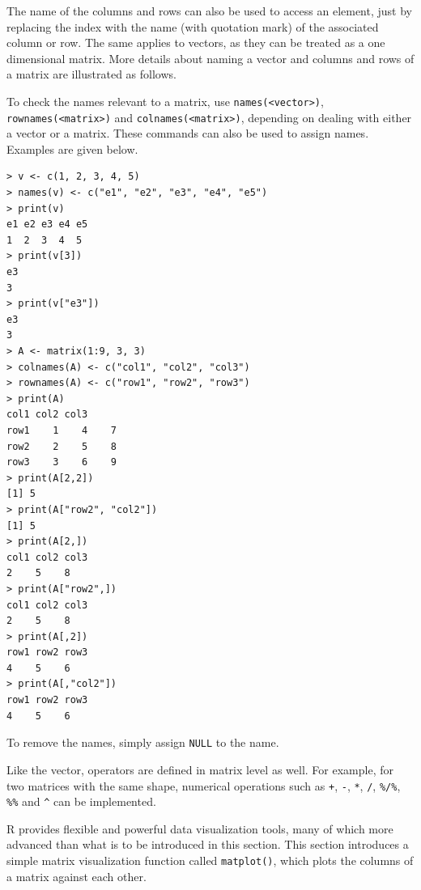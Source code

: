 The name of the columns and rows can also be used to access an element, just by replacing the index with the name (with quotation mark) of the associated column or row. The same applies to vectors, as they can be treated as a one dimensional matrix. More details about naming a vector and columns and rows of a matrix are illustrated as follows.

To check the names relevant to a matrix, use \verb|names(<vector>)|, \verb|rownames(<matrix>)| and \verb|colnames(<matrix>)|, depending on dealing with either a vector or a matrix. These commands can also be used to assign names. Examples are given below.
\begin{lstlisting}
> v <- c(1, 2, 3, 4, 5)
> names(v) <- c("e1", "e2", "e3", "e4", "e5") 	
> print(v)
e1 e2 e3 e4 e5
1  2  3  4  5
> print(v[3])
e3
3
> print(v["e3"])
e3
3
> A <- matrix(1:9, 3, 3)
> colnames(A) <- c("col1", "col2", "col3")
> rownames(A) <- c("row1", "row2", "row3")
> print(A)
col1 col2 col3
row1    1    4    7
row2    2    5    8
row3    3    6    9
> print(A[2,2])
[1] 5
> print(A["row2", "col2"])
[1] 5
> print(A[2,])
col1 col2 col3
2    5    8
> print(A["row2",])
col1 col2 col3
2    5    8
> print(A[,2])
row1 row2 row3
4    5    6
> print(A[,"col2"])
row1 row2 row3
4    5    6
\end{lstlisting}

To remove the names, simply assign \verb|NULL| to the name.

Like the vector, operators are defined in matrix level as well. For example, for two matrices with the same shape, numerical operations such as  \verb|+|, \verb|-|, \verb|*|, \verb|/|, \verb|%/%|, \verb|%%| and \verb|^| can be implemented.

R provides flexible and powerful data visualization tools, many of which more advanced than what is to be introduced in this section. This section introduces a simple matrix visualization function called \verb|matplot()|, which plots the columns of a matrix against each other.

